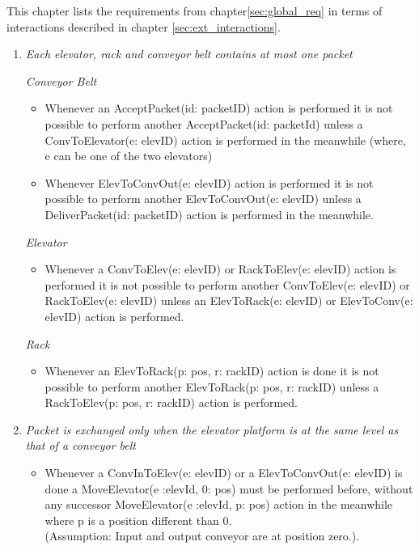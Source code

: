 
This chapter lists the requirements from chapter\ref{sec:global_req} in terms of interactions described in chapter \ref{sec:ext_interactions}.

\begin{enumerate}
\item \textit{Each elevator, rack and conveyor belt contains at most one packet}

	\textit{Conveyor Belt}
	\begin{itemize}
	\item
	Whenever an AcceptPacket(id: packetID) action is performed it
	is not possible to perform another AcceptPacket(id:
	packetId) unless a ConvToElevator(e: elevID) action is
	performed in the meanwhile (where, e can be one of the two elevators)
	\item Whenever ElevToConvOut(e: elevID) action is performed it is
	not possible to perform another ElevToConvOut(e: 
	elevID) unless a DeliverPacket(id: packetID) action is performed in the meanwhile.
	\end{itemize}
	\textit{Elevator}
	\begin{itemize}
	\item Whenever a ConvToElev(e: elevID) or RackToElev(e: elevID) 
	action is performed it is not possible to perform another
	ConvToElev(e: elevID) or RackToElev(e: elevID) unless an 
	ElevToRack(e: elevID) or ElevToConv(e: elevID) action is performed.
	\end{itemize}
	
	\textit{Rack}
	\begin{itemize}
	\item Whenever an ElevToRack(p: pos, r: rackID) action is done it is not
	possible to perform another ElevToRack(p: pos, r: rackID) unless a RackToElev(p: pos, r: rackID) action is performed.%
	\end{itemize}

\item \textit{ Packet is exchanged only when the elevator platform is at
the same level as that of a conveyor belt}
	\begin{itemize}
	\item Whenever a ConvInToElev(e: elevID) or a ElevToConvOut(e: 
	elevID) is done a MoveElevator(e :elevId, 0: pos) must be
	performed before, without any successor MoveElevator(e :elevId, p: pos) action in the meanwhile where p is a position different than 0.\\(Assumption: Input and output conveyor are at
	position zero.).	
	\end{itemize}


\end{enumerate}
